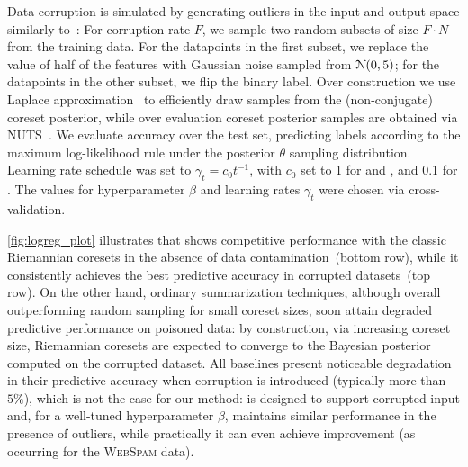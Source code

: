 Data corruption is simulated by generating outliers in the input and output space similarly to~\cite{futami18}: For corruption rate $F$, we sample two random subsets of size $F\cdot N$ from the training data.  For the datapoints in the first subset, we replace the value of half of the features with Gaussian noise sampled \iid from $\mathcal{N}(0,5)$; for the datapoints in the other subset, we flip the binary label. Over construction we use Laplace approximation~\cite{mackay03} to efficiently draw samples from the (non-conjugate) coreset posterior, while over evaluation coreset posterior samples are obtained via NUTS~\cite{hoffman14}. We evaluate accuracy over the test set, predicting labels according to the maximum log-likelihood rule under the posterior $\theta$ sampling distribution. Learning rate schedule was set to $\gamma_t=c_0 t^{-1}$, with $c_0$ set to 1 for \sparsevi{} and \bcores{}, and 0.1 for \psvi. %
The values for hyperparameter $\beta$ and learning rates $\gamma_t$ were chosen via cross-validation. 

\cref{fig:logreg_plot} illustrates that \bcores{} shows competitive performance with the classic Riemannian coresets in the absence of data contamination~(bottom row), while it consistently achieves the best predictive accuracy in corrupted datasets~(top row).  On the other hand, ordinary summarization techniques, although overall outperforming random sampling for small coreset sizes, soon attain degraded predictive performance on poisoned data: by construction, via increasing coreset size, Riemannian coresets are expected to converge to the Bayesian posterior computed on the corrupted dataset. All baselines present noticeable degradation in their predictive accuracy when corruption is introduced (typically more than $5\%$), which is not the case for our method: \bcores{} is designed to support corrupted input and, for a well-tuned hyperparameter $\beta$, maintains similar performance in the presence of outliers, while practically it can even achieve improvement (as occurring for the \textsc{WebSpam} data).


